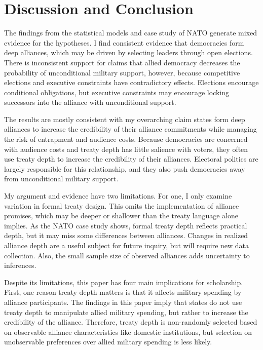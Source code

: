 \documentclass[12pt]{article}
\begin{document}
\section{Discussion and Conclusion}


The findings from the statistical models and case study of NATO generate mixed evidence for the hypotheses. 
I find consistent evidence that democracies form deep alliances, which may be driven by selecting leaders through open elections.  
There is inconsistent support for claims that allied democracy decreases the probability of unconditional military support, however, because competitive elections and executive constraints have contradictory effects. 
Elections encourage conditional obligations, but executive constraints may encourage locking successors into the alliance with unconditional support. 


The results are mostly consistent with my overarching claim states form deep alliances to increase the credibility of their alliance commitments while managing the risk of entrapment and audience costs. 
Because democracies are concerned with audience costs and treaty depth has little salience with voters, they often use treaty depth to increase the credibility of their alliances.
Electoral politics are largely responsible for this relationship, and they also push democracies away from unconditional military support. 


My argument and evidence have two limitations. 
For one, I only examine variation in formal treaty design. 
This omits the implementation of alliance promises, which may be deeper or shallower than the treaty language alone implies. 
As the NATO case study shows, formal treaty depth reflects practical depth, but it may miss some differences between alliances. 
Changes in realized alliance depth are a useful subject for future inquiry, but will require new data collection.
Also, the small sample size of observed alliances adds uncertainty to inferences.  


Despite its limitations, this paper has four main implications for scholarship. 
First, one reason treaty depth matters is that it affects military spending by alliance participants.
The findings in this paper imply that states do not use treaty depth to manipulate allied military spending, but rather to increase the credibility of the alliance. 
Therefore, treaty depth is non-randomly selected based on observable alliance characteristics like domestic institutions, but selection on unobservable preferences over allied military spending is less likely. 
\end{document}
